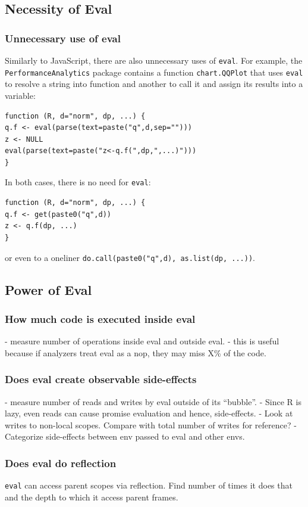\documentclass[USenglish,cleveref, autoref, thm-restate]{lipics-v2019}
\newcommand{\eval}{\texttt{eval}\xspace}
\renewcommand{\c}[1]{\lstinline{#1}\xspace}
\begin{document}
\subsection{Necessity of Eval}

\subsubsection{Unnecessary use of eval}
  Similarly to JavaScript, there are also unnecessary uses of \eval.
  For example, the \c{PerformanceAnalytics} package contains a function
  \c{chart.QQPlot} that uses \eval to resolve a string into function and
  another to call it and assign its results into a variable:
\begin{lstlisting}
function (R, d="norm", dp, ...) {
q.f <- eval(parse(text=paste("q",d,sep="")))
z <- NULL
eval(parse(text=paste("z<-q.f(",dp,",...)")))
}
\end{lstlisting}
  In both cases, there is no need for \eval:
\begin{lstlisting}
function (R, d="norm", dp, ...) {
q.f <- get(paste0("q",d))
z <- q.f(dp, ...)
}
\end{lstlisting}
  or even to a oneliner \c{do.call(paste0("q",d), as.list(dp, ...))}.

\subsection{Power of Eval}

\subsubsection{How much code is executed inside eval}
- measure number of operations inside eval and outside eval.
- this is useful because if analyzers treat eval as a nop, they may miss X\% of the code.

\subsubsection{Does eval create observable side-effects}
- measure number of reads and writes by eval outside of its ``bubble''.
- Since R is lazy, even reads can cause promise evaluation and hence, side-effects.
- Look at writes to non-local scopes. Compare with total number of writes for
reference?
- Categorize side-effects between env passed to eval and other envs.

\subsubsection{Does eval do reflection}
\eval can access parent scopes via reflection. Find number of times it does that
and the depth to which it access parent frames.
\end{document}
